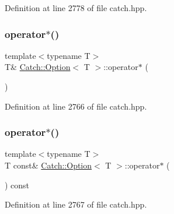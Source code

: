 Definition at line 2778 of file catch.\+hpp.

\hypertarget{class_catch_1_1_option_afd989852fa453731c3190dac63caccb0}{}\label{class_catch_1_1_option_afd989852fa453731c3190dac63caccb0} 
\subsubsection{\texorpdfstring{operator$\ast$()}{operator*()}\hspace{0.1cm}{\footnotesize\ttfamily [1/2]}}
{\footnotesize\ttfamily template$<$typename T$>$ \\
T\& \hyperlink{class_catch_1_1_option}{Catch\+::\+Option}$<$ T $>$\+::operator$\ast$ (\begin{DoxyParamCaption}{ }\end{DoxyParamCaption})\hspace{0.3cm}{\ttfamily [inline]}}



Definition at line 2766 of file catch.\+hpp.

\hypertarget{class_catch_1_1_option_a734fc9c2eb1a1f7f8e8f6a4eb12160f0}{}\label{class_catch_1_1_option_a734fc9c2eb1a1f7f8e8f6a4eb12160f0} 
\subsubsection{\texorpdfstring{operator$\ast$()}{operator*()}\hspace{0.1cm}{\footnotesize\ttfamily [2/2]}}
{\footnotesize\ttfamily template$<$typename T$>$ \\
T const\& \hyperlink{class_catch_1_1_option}{Catch\+::\+Option}$<$ T $>$\+::operator$\ast$ (\begin{DoxyParamCaption}{ }\end{DoxyParamCaption}) const\hspace{0.3cm}{\ttfamily [inline]}}



Definition at line 2767 of file catch.\+hpp.

\hypertarget{class_catch_1_1_option_acad340798a16c8f700f8763119e90f31}{}\label{class_catch_1_1_option_acad340798a16c8f700f8763119e90f31} 
